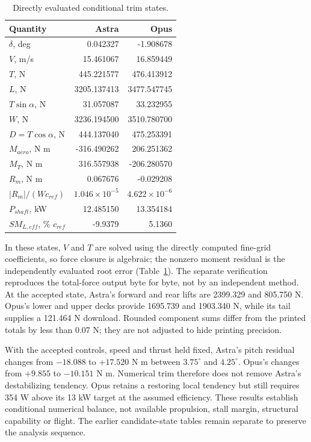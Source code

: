 \documentclass[11pt,a4paper]{article}
\begin{document}
\begin{table}[H]\centering\small
\caption{Directly evaluated conditional trim states.}\label{tab:retrim}
\begin{tabular}{lrr}\toprule
Quantity & Astra & Opus\\\midrule
$\delta$, deg &0.042327&-1.908678\\
$V$, m/s &15.461067&16.859449\\
$T$, N &445.221577&476.413912\\
$L$, N &3205.137413&3477.547745\\
$T\sin\alpha$, N &31.057087&33.232955\\
$W$, N &3236.194500&3510.780700\\
$D=T\cos\alpha$, N &444.137040&475.253391\\
$M_{aero}$, N m &-316.490262&206.251362\\
$M_T$, N m &316.557938&-206.280570\\
$R_m$, N m &0.067676&-0.029208\\
$|R_m|/(Wc_{ref})$ &$1.046\times10^{-5}$&$4.622\times10^{-6}$\\
$P_{shaft}$, kW &12.485150&13.354184\\
$SM_{L,eff}$, \% $c_{ref}$ &-9.9379&5.1360\\\bottomrule
\end{tabular}
\end{table}

In these states, $V$ and $T$ are solved using the directly computed fine-grid coefficients, so force closure is algebraic; the nonzero moment residual is the independently evaluated root error (Table~\ref{tab:retrim}). The separate verification reproduces the total-force output byte for byte, not by an independent method. At the accepted state, Astra's forward and rear lifts are 2399.329 and 805.750 N. Opus's lower and upper decks provide 1695.739 and 1903.340 N, while its tail supplies a 121.464 N download. Rounded component sums differ from the printed totals by less than 0.07 N; they are not adjusted to hide printing precision.

With the accepted controls, speed and thrust held fixed, Astra's pitch residual changes from $-18.088$ to $+17.520$ N m between $3.75^\circ$ and $4.25^\circ$. Opus's changes from $+9.855$ to $-10.151$ N m. Numerical trim therefore does not remove Astra's destabilizing tendency. Opus retains a restoring local tendency but still requires 354 W above its 13 kW target at the assumed efficiency. These results establish conditional numerical balance, not available propulsion, stall margin, structural capability or flight. The earlier candidate-state tables remain separate to preserve the analysis sequence.
\end{document}
